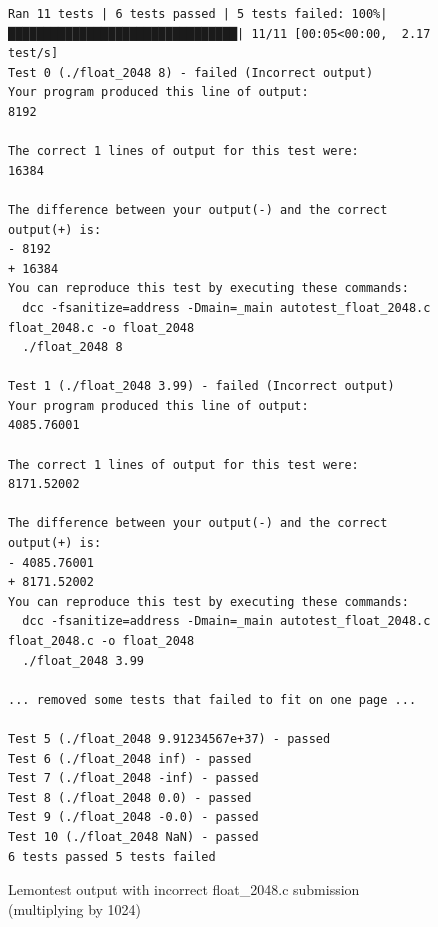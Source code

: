 \documentclass[hidelinks]{report}
\begin{document}
\begin{figure}[h]
	\centering
	\begin{lstlisting}[breaklines=true, linewidth=\linewidth, tabsize=4]
Ran 11 tests | 6 tests passed | 5 tests failed: 100%|████████████████████████████████| 11/11 [00:05<00:00,  2.17 test/s]
Test 0 (./float_2048 8) - failed (Incorrect output)
Your program produced this line of output:
8192

The correct 1 lines of output for this test were:
16384

The difference between your output(-) and the correct output(+) is:
- 8192
+ 16384
You can reproduce this test by executing these commands:
  dcc -fsanitize=address -Dmain=_main autotest_float_2048.c float_2048.c -o float_2048
  ./float_2048 8

Test 1 (./float_2048 3.99) - failed (Incorrect output)
Your program produced this line of output:
4085.76001

The correct 1 lines of output for this test were:
8171.52002

The difference between your output(-) and the correct output(+) is:
- 4085.76001
+ 8171.52002
You can reproduce this test by executing these commands:
  dcc -fsanitize=address -Dmain=_main autotest_float_2048.c float_2048.c -o float_2048
  ./float_2048 3.99

... removed some tests that failed to fit on one page ...

Test 5 (./float_2048 9.91234567e+37) - passed
Test 6 (./float_2048 inf) - passed
Test 7 (./float_2048 -inf) - passed
Test 8 (./float_2048 0.0) - passed
Test 9 (./float_2048 -0.0) - passed
Test 10 (./float_2048 NaN) - passed
6 tests passed 5 tests failed
	\end{lstlisting}
	\caption{Lemontest output with incorrect float\_2048.c submission (multiplying by 1024)}
	\label{fig:floatTestIncorrect}
\end{figure}
\end{document}
